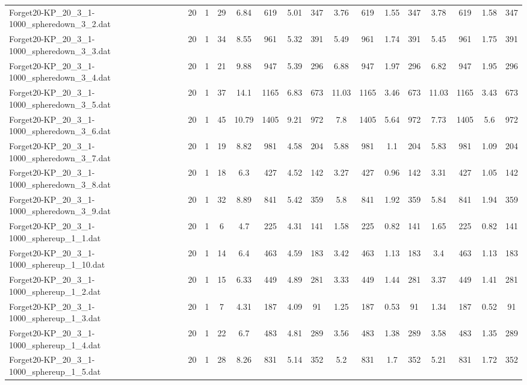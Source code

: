 \begin{sidewaystable}[!ht]
{\begin{tabular}{lccccccccccccccc}
Forget20-KP\_20\_3\_1-1000\_spheredown\_3\_2.dat & 20 & 1 & 29 & 6.84 & 619 & 5.01 & 347 & 3.76 & 619 & 1.55 & 347 & 3.78 & 619 & 1.58 & 347 \\
Forget20-KP\_20\_3\_1-1000\_spheredown\_3\_3.dat & 20 & 1 & 34 & 8.55 & 961 & 5.32 & 391 & 5.49 & 961 & 1.74 & 391 & 5.45 & 961 & 1.75 & 391 \\
Forget20-KP\_20\_3\_1-1000\_spheredown\_3\_4.dat & 20 & 1 & 21 & 9.88 & 947 & 5.39 & 296 & 6.88 & 947 & 1.97 & 296 & 6.82 & 947 & 1.95 & 296 \\
Forget20-KP\_20\_3\_1-1000\_spheredown\_3\_5.dat & 20 & 1 & 37 & 14.1 & 1165 & 6.83 & 673 & 11.03 & 1165 & 3.46 & 673 & 11.03 & 1165 & 3.43 & 673 \\
Forget20-KP\_20\_3\_1-1000\_spheredown\_3\_6.dat & 20 & 1 & 45 & 10.79 & 1405 & 9.21 & 972 & 7.8 & 1405 & 5.64 & 972 & 7.73 & 1405 & 5.6 & 972 \\
Forget20-KP\_20\_3\_1-1000\_spheredown\_3\_7.dat & 20 & 1 & 19 & 8.82 & 981 & 4.58 & 204 & 5.88 & 981 & 1.1 & 204 & 5.83 & 981 & 1.09 & 204 \\
Forget20-KP\_20\_3\_1-1000\_spheredown\_3\_8.dat & 20 & 1 & 18 & 6.3 & 427 & 4.52 & 142 & 3.27 & 427 &  \textcolor{blue2}{0.96} & 142 & 3.31 & 427 & 1.05 & 142 \\
Forget20-KP\_20\_3\_1-1000\_spheredown\_3\_9.dat & 20 & 1 & 32 & 8.89 & 841 & 5.42 & 359 & 5.8 & 841 & 1.92 & 359 & 5.84 & 841 & 1.94 & 359 \\
Forget20-KP\_20\_3\_1-1000\_sphereup\_1\_1.dat & 20 & 1 & 6 & 4.7 & 225 & 4.31 & 141 & 1.58 & 225 &  \textcolor{blue2}{0.82} & 141 & 1.65 & 225 &  \textcolor{blue2}{0.82} & 141 \\
Forget20-KP\_20\_3\_1-1000\_sphereup\_1\_10.dat & 20 & 1 & 14 & 6.4 & 463 & 4.59 & 183 & 3.42 & 463 & 1.13 & 183 & 3.4 & 463 & 1.13 & 183 \\
Forget20-KP\_20\_3\_1-1000\_sphereup\_1\_2.dat & 20 & 1 & 15 & 6.33 & 449 & 4.89 & 281 & 3.33 & 449 & 1.44 & 281 & 3.37 & 449 &  \textcolor{blue2}{1.41} & 281 \\
Forget20-KP\_20\_3\_1-1000\_sphereup\_1\_3.dat & 20 & 1 & 7 & 4.31 & 187 & 4.09 & 91 & 1.25 & 187 & 0.53 & 91 & 1.34 & 187 &  \textcolor{blue2}{0.52} & 91 \\
Forget20-KP\_20\_3\_1-1000\_sphereup\_1\_4.dat & 20 & 1 & 22 & 6.7 & 483 & 4.81 & 289 & 3.56 & 483 & 1.38 & 289 & 3.58 & 483 & 1.35 & 289 \\
Forget20-KP\_20\_3\_1-1000\_sphereup\_1\_5.dat & 20 & 1 & 28 & 8.26 & 831 & 5.14 & 352 & 5.2 & 831 & 1.7 & 352 & 5.21 & 831 & 1.72 & 352 \\

\end{tabular}}
\end{sidewaystable}
